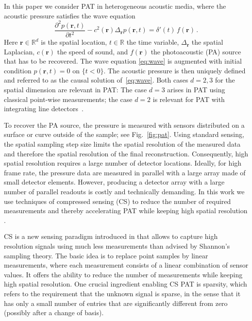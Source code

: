 \documentclass[11pt]{article}
\newcommand{\rr}{\mathbf r}
\newcommand{\source}{f}
\newcommand{\R}{\mathbb R}
\newcommand{\set}[1]{\{#1\}}
\begin{document}
In this paper we consider  PAT in heterogeneous acoustic media, where the
acoustic  pressure  satisfies the wave equation
\begin{equation} \label{eq:wave}
\frac{\partial^2 p(\rr, t)}{\partial t^2}  -  c^2(\rr)\Delta_\rr p(\rr, t)  =
\delta'(t) \, \source (\rr) \,.
\end{equation}
Here  $\rr  \in \R^d$ is the spatial location, $t \in \R$ the time variable, $\Delta_\rr$ the spatial Laplacian, $c(\rr)$ the speed of sound, and $\source (\rr)$ the  photoacoustic (PA) source that has to be recovered.
The wave equation \eqref{eq:wave} is augmented with  initial condition
$p(\rr, t) =0$  on $\set{t < 0}$. The acoustic pressure is then uniquely defined and referred to as the causal solution of~\eqref{eq:wave}.
Both cases $d  =2,3 $  for the   spatial dimension are relevant in PAT:
The case $d=3$ arises in PAT using classical point-wise measurements; the case $d=2$
is relevant   for PAT with integrating  line detectors~\cite{Bauer-Marschallinger:17,BurBauGruHalPal07,PalNusHalBur07a,paltauf2017piezoelectric}.


To recover the PA  source, the pressure is measured  with sensors
distributed on a surface or curve outside of the sample; see Fig.~\ref{fig:pat}.
Using standard  sensing, the spatial sampling step size limits the spatial resolution
of the measured  data  and therefore the spatial resolution of the final reconstruction.
Consequently, high spatial resolution requires a large number of detector  locations.
Ideally, for high frame rate, the pressure data are measured in parallel with a large
array made of small  detector elements.  However, producing a detector array with  a large number
of parallel  readouts is costly and technically demanding. In this work we use techniques
of compressed sensing (CS) to  reduce the number of required measurements and thereby
accelerating  PAT while keeping high spatial resolution \cite{sandbichler2015novel,arridge2016accelerated,betcke2016acoustic,haltmeier2016compressed}.

CS is a new sensing paradigm introduced in \cite{CanRomTao06a,CanTao06,Don06} that allows to capture high resolution signals using   much less measurements than advised by Shannon's sampling theory. The basic idea is to replace point samples by linear measurements, where each measurement consists of a  linear combination of sensor values. It  offers the ability  to reduce  the number of measurements while keeping  high spatial resolution.
One crucial ingredient enabling CS PAT is sparsity,
which refers to the requirement that the  unknown signal is sparse,
in the sense that it has only a small number of entries  that are significantly
different from zero (possibly after a change of basis).
\end{document}
